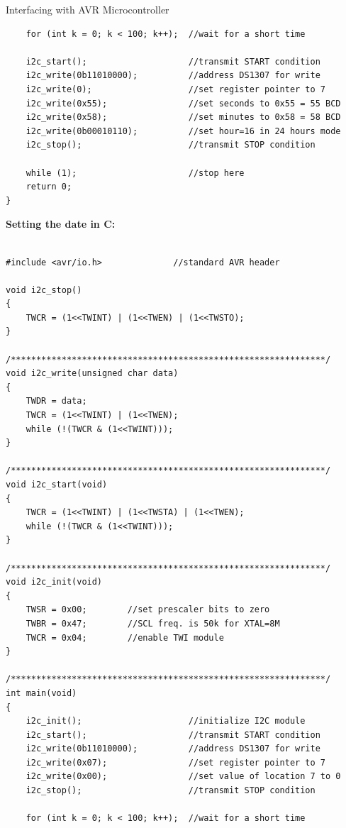 \documentclass[11pt]{beamer}
\begin{document}
\begin{frame}{Interfacing with AVR Microcontroller}
\begin{verbatim}
    for (int k = 0; k < 100; k++);  //wait for a short time

    i2c_start();                    //transmit START condition
    i2c_write(0b11010000);          //address DS1307 for write
    i2c_write(0);                   //set register pointer to 7
    i2c_write(0x55);                //set seconds to 0x55 = 55 BCD
    i2c_write(0x58);                //set minutes to 0x58 = 58 BCD
    i2c_write(0b00010110);          //set hour=16 in 24 hours mode
    i2c_stop();                     //transmit STOP condition

    while (1);                      //stop here
    return 0;
}
        \end{verbatim}

        \framebreak

        \textbf{\large Setting the date in C:}
        \\~\\
        \begin{verbatim}
#include <avr/io.h>              //standard AVR header

void i2c_stop()
{
    TWCR = (1<<TWINT) | (1<<TWEN) | (1<<TWSTO);
}

/**************************************************************/
void i2c_write(unsigned char data)
{
    TWDR = data;
    TWCR = (1<<TWINT) | (1<<TWEN);
    while (!(TWCR & (1<<TWINT)));
}

/**************************************************************/
void i2c_start(void)
{
    TWCR = (1<<TWINT) | (1<<TWSTA) | (1<<TWEN);
    while (!(TWCR & (1<<TWINT)));
}

/**************************************************************/
void i2c_init(void)
{
    TWSR = 0x00;        //set prescaler bits to zero
    TWBR = 0x47;        //SCL freq. is 50k for XTAL=8M
    TWCR = 0x04;        //enable TWI module
}

/**************************************************************/
int main(void)
{
    i2c_init();                     //initialize I2C module
    i2c_start();                    //transmit START condition
    i2c_write(0b11010000);          //address DS1307 for write
    i2c_write(0x07);                //set register pointer to 7
    i2c_write(0x00);                //set value of location 7 to 0
    i2c_stop();                     //transmit STOP condition

    for (int k = 0; k < 100; k++);  //wait for a short time


\end{verbatim}
\end{frame}
\end{document}
